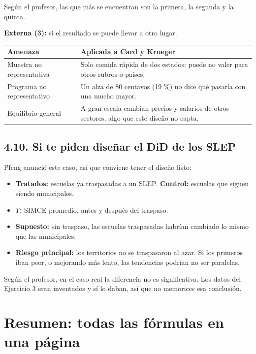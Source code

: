\documentclass[11pt,letterpaper]{article}
\newcommand{\parte}[1]{\section*{\textcolor{azul}{#1}}}
\newcommand{\tema}[1]{\subsection*{#1}}
\begin{document}
Según el profesor, las que más se encuentran son la primera, la segunda y la quinta.

\textbf{Externa (3):} si el resultado se puede llevar a otro lugar.

\begin{center}
\begin{tabular}{p{3.6cm}p{11.2cm}}
\toprule
\textbf{Amenaza} & \textbf{Aplicada a Card y Krueger} \\
\midrule
Muestra no representativa & Solo comida rápida de dos estados: puede no valer para otros rubros o países. \\
Programa no representativo & Un alza de 80 centavos (19 \%) no dice qué pasaría con una mucho mayor. \\
Equilibrio general & A gran escala cambian precios y salarios de otros sectores, algo que este diseño no capta. \\
\bottomrule
\end{tabular}
\end{center}

\tema{4.10. Si te piden diseñar el DiD de los SLEP}

Pfeng anunció este caso, así que conviene tener el diseño listo:

\begin{itemize}
  \item \textbf{Tratados:} escuelas ya traspasadas a un SLEP. \textbf{Control:} escuelas que siguen siendo municipales.
  \item \textbf{$Y$:} SIMCE promedio, antes y después del traspaso.
  \item \textbf{Supuesto:} sin traspaso, las escuelas traspasadas habrían cambiado lo mismo que las municipales.
  \item \textbf{Riesgo principal:} los territorios no se traspasaron al azar. Si los primeros iban peor, o mejorando más lento, las tendencias podrían no ser paralelas.
\end{itemize}

Según el profesor, en el caso real la diferencia no es significativa. Los datos del Ejercicio 3 eran inventados y sí lo daban, así que no memorices esa conclusión.

\newpage
\parte{Resumen: todas las fórmulas en una página}
\end{document}
